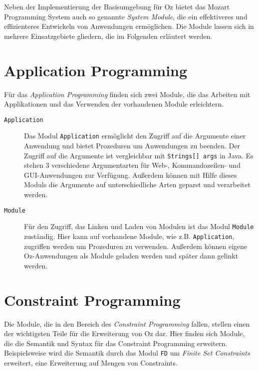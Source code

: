 Neben der Implementierung der Basisumgebung für Oz bietet das Mozart Programming
System auch so genannte \textsl{System Module}, die ein effektiveres und
effizienteres Entwickeln von Anwendungen ermöglichen. Die Module lassen sich in
mehrere Einsatzgebiete gliedern, die im Folgenden erläutert werden. 
 
\section{Application Programming}

Für das \textsl{Application Programming} finden sich zwei Module, die das
Arbeiten mit Applikationen und das Verwenden der vorhandenen Module erleichtern.

\begin{description}
  \item[\texttt{Application}] Das Modul \texttt{Application} ermöglicht den
  Zugriff auf die Argumente einer Anwendung und bietet Prozeduren um
  Anwendungen zu beenden. Der Zugriff auf die Argumente ist vergleichbar mit
  \texttt{Strings[] args} in Java. Es stehen 3 verschiedene Argumentarten für
  Web-, Kommandozeilen- und GUI-Anwendungen zur Verfügung. Außerdem können mit
  Hilfe dieses Moduls die Argumente auf unterschiedliche Arten geparst und
  verarbeitet werden. 
  \item[\texttt{Module}] Für den Zugriff, das Linken und Laden von Modulen ist
  das Modul \texttt{Module} zuständig. Hier kann auf vorhandene Module, wie z.B.
  \texttt{Application}, zugriffen werden um Prozeduren zu verwenden. Außerdem
  können eigene Oz-Anwendungen als Module geladen werden und später dann gelinkt
  werden.
\end{description}

\section{Constraint Programming}

Die Module, die in den Bereich des \textsl{Constraint Programming} fallen,
stellen einen der wichtigsten Teile für die Erweiterung von Oz dar. Hier finden
sich Module, die die Semantik und Syntax für das Constraint Programming
erweitern. Beispielsweise wird die Semantik durch das Modul \texttt{FD} um
\textsl{Finite Set Constraints} erweitert, eine Erweiterung auf Mengen von
Constraints. 

